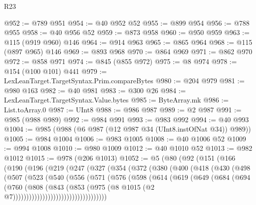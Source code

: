 \begin{lexlean}{R23}
\begin{coremodule}
@952 := @789 @951
@954 := @40 @952 @52
@955 := @899 @954
@956 := @788 @955
@958 := @40 @956 @52
@959 := @873 @958
@960 := @950 @959
@963 := @115 (@919 @960) @146
@964 := @914 @963
@965 := @865 @964
@968 := @115 (@897 @965) @146
@969 := @893 @968
@970 := @864 @969
@971 := @862 @970
@972 := @858 @971
@974 := @845 (@855 @972)
@975 := @8 @974
@978 := @154 (@100 @101) @441
@979 := LexLeanTarget.TargetSyntax.Prim.compareBytes
@980 := @204 @979
@981 := @980 @163
@982 := @40 @981
@983 := @300 @26
@984 := LexLeanTarget.TargetSyntax.Value.bytes
@985 := ByteArray.mk
@986 := List.toArray.{0}
@987 := UInt8
@988 := @986 @987
@989 := @2 @987
@991 := @985 (@988 @989)
@992 := @984 @991
@993 := @983 @992
@994 := @40 @993
@1004 := @985 (@988 (@6 @987 (@12 @987 @34 (UInt8.instOfNat @34)) @989))
@1005 := @984 @1004
@1006 := @983 @1005
@1008 := @40 @1006 @52
@1009 := @994 @1008
@1010 := @980 @1009
@1012 := @40 @1010 @52
@1013 := @982 @1012
@1015 := @978 (@206 @1013)
@1052 := @5
    (@80
      (@92
        (@151
          (@166
            (@190
              (@196
                (@219
                  (@247
                    (@327
                      (@354
                        (@372
                          (@380
                            (@400
                              (@418
                                (@430
                                  (@498
                                    (@507
                                      (@523
                                        (@540
                                          (@556
                                            (@571
                                              (@576
                                                (@598
                                                  (@614
                                                    (@619
                                                      (@649
                                                        (@684
                                                          (@694
                                                            (@760
                                                              (@808
                                                                (@843
                                                                  (@853
                                                                    (@975
                                                                      (@8
                                                                        @1015
                                                                        (@2
                                                                          @7)))))))))))))))))))))))))))))))))))

\end{coremodule}
\end{lexlean}

